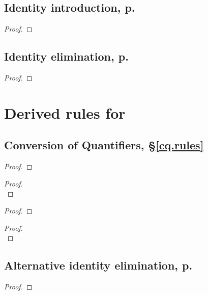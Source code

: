 \begin{multicols}{2}
\subsection*{Identity introduction, p.\ \pageref{idint}}

\begin{proof}
	 \idi{}
\end{proof}


\subsection*{Identity elimination, p.\ \pageref{idelim}}

\begin{proof}
	 
\end{proof}
\end{multicols}

\section*{Derived rules for \FOL}
\begin{multicols}{2}
\subsection*{Conversion of Quantifiers, §\ref{cq.rules}}
\begin{proof}
\end{proof}
\begin{proof}
\\	
\end{proof}
\begin{proof}
\end{proof}
\begin{proof}
\\	
\end{proof}
\subsection*{Alternative identity elimination, p.\ \pageref{id.es}}
\begin{proof}
	 
	\end{proof}
\end{multicols}

\renewcommand{\indexname}{Index of defined terms}\printindex %
